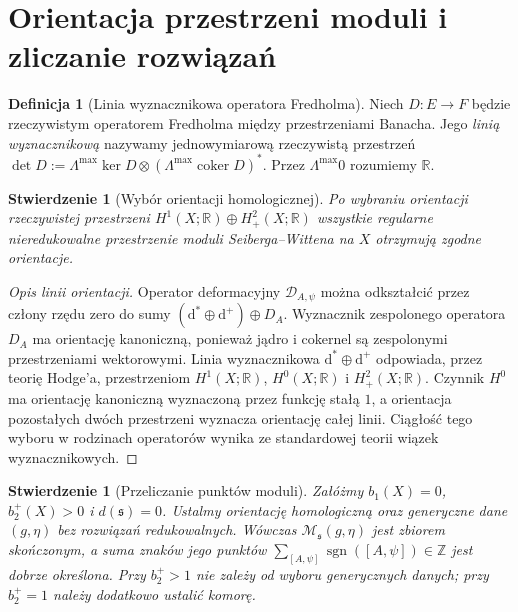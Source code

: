 \documentclass[11pt,a4paper]{report}
\numberwithin{equation}{section}
\theoremstyle{plain}
\newtheorem{stwierdzenie}[twierdzenie]{Stwierdzenie}
\theoremstyle{definition}
\newtheorem{definicja}[twierdzenie]{Definicja}
\theoremstyle{remark}
\begin{document}
\section{Orientacja przestrzeni moduli i zliczanie rozwiązań}
\label{sec:tg-sw12-orientation}

\begin{definicja}[Linia wyznacznikowa operatora Fredholma]
Niech $D:E\to F$ będzie rzeczywistym operatorem Fredholma
między przestrzeniami Banacha. Jego \emph{linią wyznacznikową}
nazywamy jednowymiarową rzeczywistą przestrzeń
$\det D:=\Lambda^{\max}\ker D\otimes
(\Lambda^{\max}\operatorname{coker}D)^*$.
Przez $\Lambda^{\max}0$ rozumiemy $\mathbb R$.
\end{definicja}

\begin{stwierdzenie}[Wybór orientacji homologicznej]
\label{prop:tg-sw12-hom-orient}
Po wybraniu orientacji rzeczywistej przestrzeni
$H^1(X;\mathbb R)\oplus H^2_+(X;\mathbb R)$
wszystkie regularne nieredukowalne przestrzenie moduli
Seiberga--Wittena na $X$ otrzymują zgodne orientacje.
\end{stwierdzenie}

\begin{proof}[Opis linii orientacji]
Operator deformacyjny $\mathcal D_{A,\psi}$ można odkształcić
przez człony rzędu zero do sumy
$(\mathrm d^*\oplus\mathrm d^+)\oplus D_A$.
Wyznacznik zespolonego operatora $D_A$ ma orientację
kanoniczną, ponieważ jądro i cokernel są zespolonymi
przestrzeniami wektorowymi. Linia wyznacznikowa
$\mathrm d^*\oplus\mathrm d^+$ odpowiada, przez teorię
Hodge'a, przestrzeniom
$H^1(X;\mathbb R)$, $H^0(X;\mathbb R)$ i $H^2_+(X;\mathbb R)$.
Czynnik $H^0$ ma orientację kanoniczną wyznaczoną przez
funkcję stałą $1$, a orientacja pozostałych dwóch
przestrzeni wyznacza orientację całej linii.
Ciągłość tego wyboru w rodzinach operatorów wynika
ze standardowej teorii wiązek wyznacznikowych.
\end{proof}

\begin{stwierdzenie}[Przeliczanie punktów moduli]
\label{prop:tg-sw12-count}
Załóżmy $b_1(X)=0$, $b_2^+(X)>0$ i $d(\mathfrak s)=0$.
Ustalmy orientację homologiczną oraz generyczne dane
$(g,\eta)$ bez rozwiązań redukowalnych. Wówczas
$\mathcal M_{\mathfrak s}(g,\eta)$ jest zbiorem skończonym,
a suma znaków jego punktów
$\sum_{[A,\psi]}\operatorname{sgn}([A,\psi])\in\mathbb Z$
jest dobrze określona. Przy $b_2^+>1$ nie zależy
od wyboru generycznych danych; przy $b_2^+=1$
należy dodatkowo ustalić komorę.
\end{stwierdzenie}
\end{document}
